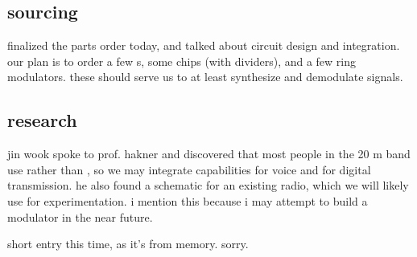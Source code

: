 \subsection*{sourcing}
finalized the parts order today, and talked about circuit design and
integration. our plan is to order a few \lna s, some \pll chips (with
dividers), and a few ring modulators. these should serve us to at least
synthesize and demodulate \fm signals.

\subsection*{research}
jin wook spoke to prof. hakner and discovered that most people in the 20 m band
use \ssb \am rather than \fm, so we may integrate \am capabilities for voice
and \fm for digital transmission. he also found a schematic for an existing
radio, which we will likely use for experimentation. i mention this because i
may attempt to build a \ssb modulator in the near future.

short entry this time, as it's from memory. sorry.
